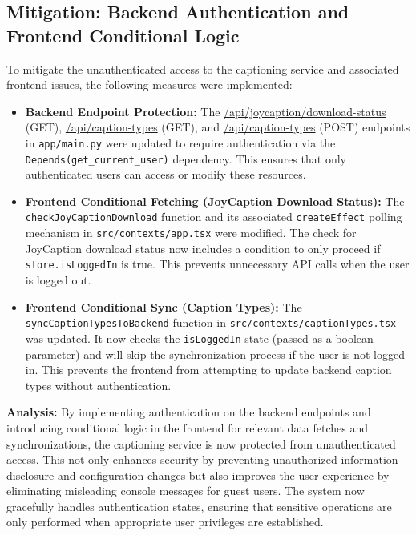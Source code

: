 \documentclass{article}
\begin{document}
\subsection{\texorpdfstring{\textbf{Mitigation: Backend Authentication and Frontend Conditional Logic}}{Mitigation: Backend Authentication and Frontend Conditional Logic}}
To mitigate the unauthenticated access to the captioning service and associated frontend issues, the following measures were implemented:
\begin{itemize}
    \item \textbf{Backend Endpoint Protection:}
    The \url{/api/joycaption/download-status} (GET), \url{/api/caption-types} (GET), and \url{/api/caption-types} (POST) endpoints in \texttt{app/main.py} were updated to require authentication via the \texttt{Depends(get\_current\_user)} dependency. This ensures that only authenticated users can access or modify these resources.
    \item \textbf{Frontend Conditional Fetching (JoyCaption Download Status):}
    The \texttt{checkJoyCaptionDownload} function and its associated \texttt{createEffect} polling mechanism in \texttt{src/contexts/app.tsx} were modified. The check for JoyCaption download status now includes a condition to only proceed if \texttt{store.isLoggedIn} is true. This prevents unnecessary API calls when the user is logged out.
    \item \textbf{Frontend Conditional Sync (Caption Types):}
    The \texttt{syncCaptionTypesToBackend} function in \texttt{src/contexts/captionTypes.tsx} was updated. It now checks the \texttt{isLoggedIn} state (passed as a boolean parameter) and will skip the synchronization process if the user is not logged in. This prevents the frontend from attempting to update backend caption types without authentication.
\end{itemize}
\textbf{Analysis:}
By implementing authentication on the backend endpoints and introducing conditional logic in the frontend for relevant data fetches and synchronizations, the captioning service is now protected from unauthenticated access. This not only enhances security by preventing unauthorized information disclosure and configuration changes but also improves the user experience by eliminating misleading console messages for guest users. The system now gracefully handles authentication states, ensuring that sensitive operations are only performed when appropriate user privileges are established.
\end{document}
